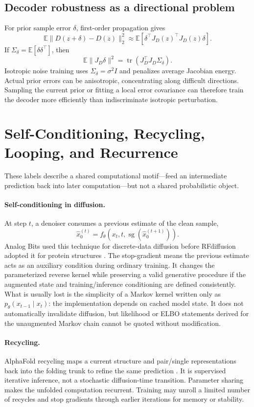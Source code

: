 \documentclass{article}
\newcommand{\stopgrad}{\operatorname{sg}}
\newcommand{\E}{\mathbb{E}}
\begin{document}
\subsection{Decoder robustness as a directional problem}

For prior sample error \(\delta\), first-order propagation gives
\[
\E\|D(z+\delta)-D(z)\|_2^2
\approx
\E\left[\delta^\top J_D(z)^\top J_D(z)\delta\right].
\]
If \(\Sigma_\delta=\E[\delta\delta^\top]\), then
\[
\E\|J_D\delta\|^2
=\operatorname{tr}\!\left(J_D^\top J_D\Sigma_\delta\right).
\]
Isotropic noise training uses \(\Sigma_\delta=\sigma^2I\) and penalizes average Jacobian energy. Actual prior errors can be anisotropic, concentrating along difficult directions. Sampling the current prior or fitting a local error covariance can therefore train the decoder more efficiently than indiscriminate isotropic perturbation.

\section{Self-Conditioning, Recycling, Looping, and Recurrence}
\label{app:recurrence}

These labels describe a shared computational motif---feed an intermediate prediction back into later computation---but not a shared probabilistic object.

\paragraph{Self-conditioning in diffusion.}
At step \(t\), a denoiser consumes a previous estimate of the clean sample,
\[
\hat x_0^{(t)}=f_\theta(x_t,t,\stopgrad(\hat x_0^{(t+1)})).
\]
Analog Bits used this technique for discrete-data diffusion before RFdiffusion adopted it for protein structures \citep{chen2023selfcondition,watson2023rfdiffusion}. The stop-gradient means the previous estimate acts as an auxiliary condition during ordinary training. It changes the parameterized reverse kernel while preserving a valid generative procedure if the augmented state and training/inference conditioning are defined consistently. What is usually lost is the simplicity of a Markov kernel written only as \(p_\theta(x_{t-1}\mid x_t)\): the implementation depends on cached model state. It does not automatically invalidate diffusion, but likelihood or ELBO statements derived for the unaugmented Markov chain cannot be quoted without modification.

\paragraph{Recycling.}
AlphaFold recycling maps a current structure and pair/single representations back into the folding trunk to refine the same prediction \citep{jumper2021alphafold}. It is supervised iterative inference, not a stochastic diffusion-time transition. Parameter sharing makes the unfolded computation recurrent. Training may unroll a limited number of recycles and stop gradients through earlier iterations for memory or stability.
\end{document}
